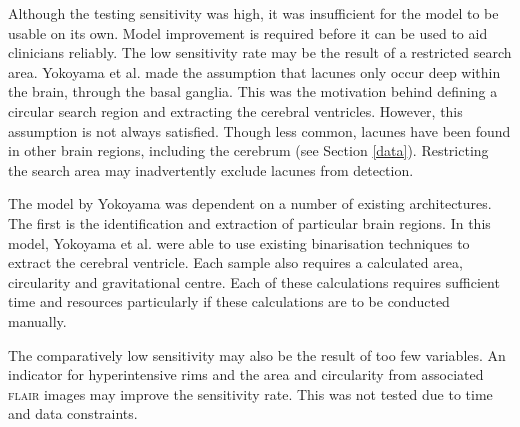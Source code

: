 Although the testing sensitivity was high, it was insufficient for the model to be usable on its own. Model improvement is required before it can be used to aid clinicians reliably. The low sensitivity rate may be the result of a restricted search area. Yokoyama et al. \cite{Yokoyama2007} made the assumption that lacunes only occur deep within the brain, through the basal ganglia. This was the motivation behind defining a circular search region and extracting the cerebral ventricles. However, this assumption is not always satisfied. Though less common, lacunes have been found in other brain regions, including the cerebrum (see Section \ref{data}). Restricting the search area may inadvertently exclude lacunes from detection.

The model by Yokoyama was dependent on a number of existing architectures. The first is the identification and extraction of particular brain regions. In this model, Yokoyama et al. were able to use existing binarisation techniques to extract the cerebral ventricle. Each sample also requires a calculated area, circularity and gravitational centre. Each of these calculations requires sufficient time and resources particularly if these calculations are to be conducted manually.

The comparatively low sensitivity may also be the result of too few variables. An indicator for hyperintensive rims and the area and circularity from associated \textsc{flair} images may improve the sensitivity rate. This was not tested due to time and data constraints.

